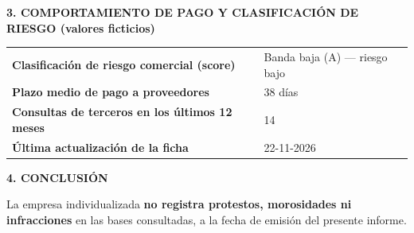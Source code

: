 \documentclass[11pt]{article}
\newcommand{\campo}[2]{\textbf{#1} & #2\\}
\newcommand{\banda}[1]{\par\medskip\noindent\colorbox{SIMclaro}{\parbox{\dimexpr\linewidth-2\fboxsep}{\bfseries\small #1}}\par\smallskip}
\begin{document}
\banda{3. COMPORTAMIENTO DE PAGO Y CLASIFICACIÓN DE RIESGO (valores ficticios)}
\noindent\begin{tabularx}{\linewidth}{@{}X l@{}}
  \campo{Clasificación de riesgo comercial (score)}{Banda baja (A) --- riesgo bajo}
  \campo{Plazo medio de pago a proveedores}{38 días}
  \campo{Consultas de terceros en los últimos 12 meses}{14}
  \campo{Última actualización de la ficha}{22-11-2026}
\end{tabularx}

\banda{4. CONCLUSIÓN}
\noindent La empresa individualizada \textbf{no registra protestos, morosidades ni infracciones} en las bases consultadas, a la fecha de emisión del presente informe.

\end{document}

